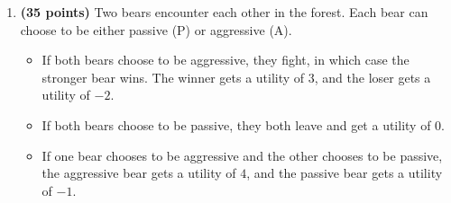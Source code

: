 \documentclass[11pt]{article}
\begin{document}
\begin{enumerate}[label=\textbf{\arabic*.}, leftmargin=*]
\begin{enumerate}[label=(\alph*)]
    \item \textbf{(15 points)} Suppose next that manufacturer A has different possible production costs: low $c_L$ or high $c_H$, where $0 < c_L < c_H$. Manufacturer A knows their costs, but manufacturer B does not. Manufacturer B does, however, believe that the manufacturing cost for A is $c_L$ with probability $p$. What is the resulting Bayes-Nash equilibrium?
\end{enumerate}

\textbf{Solution:}

\textbf{a)}

Assume $p \ge 0$
\[
p(q_A,q_B)=\alpha-q_A-q_B
\]

The payoffs are
\[
u_A(q_A,q_B)=q_A(\alpha-q_A-q_B-c_A)
\]
\[
u_B(q_A,q_B)=q_B(\alpha-q_A-q_B-c_B)
\]
 \(A\)'s best response is
\[
q_A=\frac{\alpha-c_A-q_B}{2}
\]
\(B\)'s best response is
\[
q_B=\frac{\alpha-c_B-q_A}{2}
\]
Thus,
\[
2q_A+q_B=\alpha-c_A,
\]
\[
q_A+2q_B=\alpha-c_B.
\]
Then,
\[
q_A^*=\frac{\alpha-2c_A+c_B}{3}
\]
\[
q_B^*=\frac{\alpha-2c_B+c_A}{3}.
\]

\textbf{b)}

We have

\[
c_A=
\begin{cases}
c_L, & \text{with probability } p,\\
c_H, & \text{with probability } 1-p,
\end{cases}
\qquad 0<c_L<c_H.
\]

Let \(q_L\) be \(A\)'s output when \(c_A=c_L\), and let \(q_H\) be the output when \(c_A=c_H\).

\(A\)'s best responses are
\[
q_L=\frac{\alpha-c_L-q_B}{2},
\]
\[
q_H=\frac{\alpha-c_H-q_B}{2}.
\]
\(B\)'s best response is
\[
q_B=\frac{\alpha-c_B-pq_L-(1-p)q_H}{2}.
\]
Let
\[
\bar c_A=pc_L+(1-p)c_H.
\]

Then the Bayes-Nash equilibrium is

\[
q_B^*=\frac{\alpha-2c_B+\bar c_A}{3}
\]

\[
q_L^*
=
\frac{2\alpha+2c_B-\bar c_A-3c_L}{6}
\]

\[
q_H^*
=
\frac{2\alpha+2c_B-\bar c_A-3c_H}{6}.
\]

\newpage

\item \textbf{(35 points)} Two bears encounter each other in the forest. Each bear can choose to be either passive (P) or aggressive (A).

\begin{itemize}
    \item If both bears choose to be aggressive, they fight, in which case the stronger bear wins. The winner gets a utility of $3$, and the loser gets a utility of $-2$.
    \item If both bears choose to be passive, they both leave and get a utility of $0$.
    \item If one bear chooses to be aggressive and the other chooses to be passive, the aggressive bear gets a utility of $4$, and the passive bear gets a utility of $-1$.
\end{itemize}


\end{enumerate}
\end{document}
